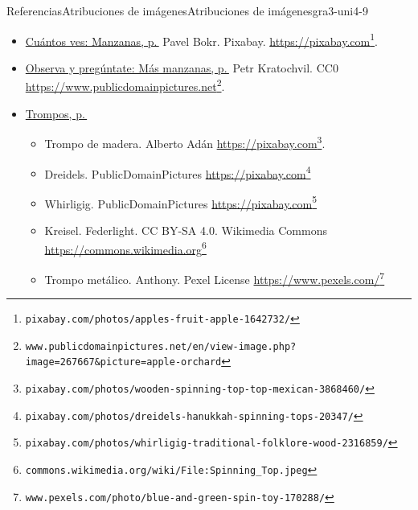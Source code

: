 \documentclass[twoside,10pt,]{article}
\begin{document}
\begin{references-section}{Referencias}{Atribuciones de imágenes}{}{Atribuciones de imágenes}{}{}{gra3-uni4-9}
%
\begin{itemize}[label=\textbullet]
\item{}\hyperref[warm-cuantosVes-Manzanas]{Cuántos ves: Manzanas, p.\,\pageref{warm-cuantosVes-Manzanas}} Pavel Bokr. Pixabay. \href{https://pixabay.com/photos/apples-fruit-apple-1642732/}{https:\slash{}\slash{}pixabay.com}\footnote{\nolinkurl{pixabay.com/photos/apples-fruit-apple-1642732/}\label{gra3-uni4-9-2-1-3}}.%
\item{}\hyperref[warm-observa-arbolManzanas]{Observa y pregúntate: Más manzanas, p.\,\pageref{warm-observa-arbolManzanas}}  Petr Kratochvil. CC0 \href{https://www.publicdomainpictures.net/en/view-image.php?image=267667\&picture=apple-orchard}{https:\slash{}\slash{}www.publicdomainpictures.net}\footnote{\nolinkurl{www.publicdomainpictures.net/en/view-image.php?image=267667\&picture=apple-orchard}\label{gra3-uni4-9-2-2-3}}.%
\item{}\hyperref[act-trompos]{Trompos, p.\,\pageref{act-trompos}}%
%
\begin{itemize}[label=$\circ$]
\item{}Trompo de madera. Alberto Adán \href{https://pixabay.com/photos/wooden-spinning-top-top-mexican-3868460/}{https:\slash{}\slash{}pixabay.com}\footnote{\nolinkurl{pixabay.com/photos/wooden-spinning-top-top-mexican-3868460/}\label{gra3-uni4-9-2-3-2-1-2}}.%
\item{}Dreidels. PublicDomainPictures \href{https://pixabay.com/photos/dreidels-hanukkah-spinning-tops-20347/}{https:\slash{}\slash{}pixabay.com}\footnote{\nolinkurl{pixabay.com/photos/dreidels-hanukkah-spinning-tops-20347/}\label{gra3-uni4-9-2-3-2-2-2}}%
\item{}Whirligig. PublicDomainPictures \href{https://pixabay.com/photos/whirligig-traditional-folklore-wood-2316859/}{https:\slash{}\slash{}pixabay.com}\footnote{\nolinkurl{pixabay.com/photos/whirligig-traditional-folklore-wood-2316859/}\label{gra3-uni4-9-2-3-2-3-2}}%
\item{}Kreisel. Federlight. CC BY-SA 4.0. Wikimedia Commons \href{https://commons.wikimedia.org/wiki/File:Spinning_Top.jpeg}{https:\slash{}\slash{}commons.wikimedia.org}\footnote{\nolinkurl{commons.wikimedia.org/wiki/File:Spinning_Top.jpeg}\label{gra3-uni4-9-2-3-2-4-2}}%
\item{}Trompo metálico.  Anthony. Pexel License \href{https://www.pexels.com/photo/blue-and-green-spin-toy-170288/}{https:\slash{}\slash{}www.pexels.com\slash{}}\footnote{\nolinkurl{www.pexels.com/photo/blue-and-green-spin-toy-170288/}\label{gra3-uni4-9-2-3-2-5-2}}%

\end{itemize}
\end{itemize}
\end{references-section}
\end{document}
